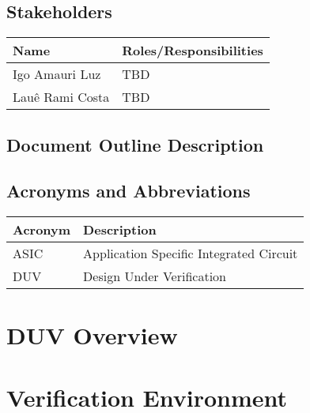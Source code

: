 \documentclass{article}
\begin{document}
	\subsection{Stakeholders}
  \FloatBarrier
  \begin{table}[H] 
    \begin{center}
      \begin{tabular}[pos]{|m{5cm} | m{8cm}|} 
        \hline %
        \cellcolor[gray]{0.9}\textbf{Name} & \cellcolor[gray]{0.9}\textbf{Roles/Responsibilities} \\ \hline
        Igo Amauri Luz & TBD \\ \hline
        Lauê Rami Costa & TBD \\ \hline
      \end{tabular}
    \end{center}
  \end{table} 
  
  \subsection{Document Outline Description}	
  
  \subsection{Acronyms and Abbreviations}
  \FloatBarrier
  \begin{table}[H]
    \begin{center}
      \begin{tabular}[pos]{|m{2cm} | m{11cm}|} 
				\hline 
				\cellcolor[gray]{0.9}\textbf{Acronym} & \cellcolor[gray]{0.9}\textbf{Description} \\ \hline
				ASIC 	& Application Specific Integrated Circuit  \\ \hline
				DUV		& Design Under Verification \\ \hline
      \end{tabular}
    \end{center}
  \end{table}  

	\newpage
	\section{DUV Overview}
	
	\newpage
	\section{Verification Environment}
	
\end{document}
